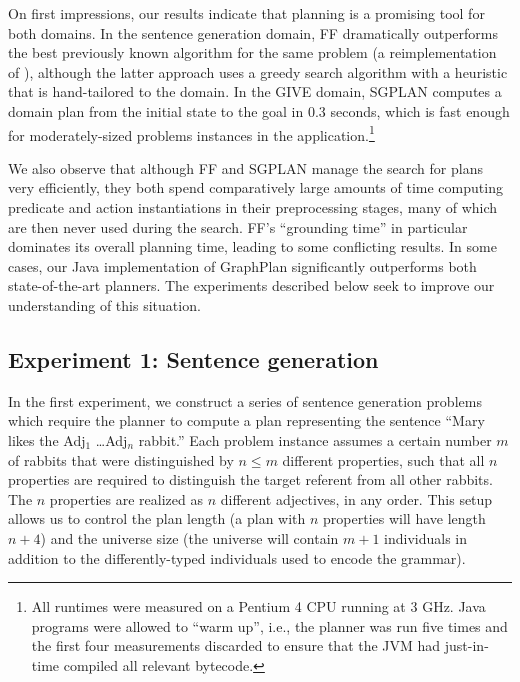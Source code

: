 \documentclass[letterpaper]{article}
\begin{document}
On first impressions, our results indicate that planning is a promising
tool for both domains.  In the sentence generation domain, FF dramatically
outperforms the best previously known algorithm for the same problem (a
reimplementation of \citep{Stone2003a}), although the latter approach uses
a greedy search algorithm with a heuristic that is hand-tailored to the
domain. In the GIVE domain, SGPLAN computes a domain plan from the initial
state to the goal in 0.3 seconds, which is fast enough for moderately-sized
problems instances in the application.\footnote{All
  runtimes were measured on a Pentium 4 CPU running at 3 GHz. Java programs
  were allowed to ``warm up'', i.e., the planner was run five times and the
  first four measurements discarded to ensure that the JVM had just-in-time
  compiled all relevant bytecode.}

We also observe that although FF and SGPLAN manage the search for plans
very efficiently, they both spend comparatively large amounts of time
computing predicate and action instantiations in their preprocessing
stages, many of which are then never used during the search. FF's
``grounding time'' in particular dominates its overall planning time,
leading to some conflicting results. In some cases, our Java implementation
of GraphPlan significantly outperforms both state-of-the-art planners. The
experiments described below seek to improve our understanding of this
situation.


\subsection{Experiment 1: Sentence generation}
\label{sec:exper-1:-sent}

In the first experiment, we construct a series of sentence generation
problems which require the planner to compute a plan representing the
sentence ``Mary likes the Adj$_1$ \ldots Adj$_n$ rabbit.''  Each problem
instance assumes a certain number $m$ of rabbits that were distinguished by
$n \leq m$ different properties, such that all $n$ properties are required
to distinguish the target referent from all other rabbits.  The $n$
properties are realized as $n$ different adjectives, in any order.  This
setup allows us to control the plan length (a plan with $n$ properties will
have length $n+4$) and the universe size (the universe will contain $m+1$
individuals in addition to the differently-typed individuals used to encode
the grammar).
\end{document}
